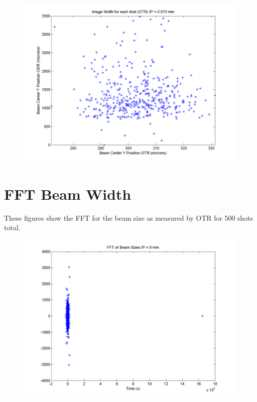 \documentclass[12pt]{article}
\begin{document}
\begin{figure}
\begin{center}
\includegraphics[scale=0.5]{Figures/YPosition_OTRODR_570.PNG}
\caption{}
\end{center}
\end{figure}


\newpage

\section{FFT Beam Width}

These figures show the FFT for the beam size as measured by OTR for 500 shots total.

\begin{figure}
\begin{center}
\includegraphics[scale=0.5]{Figures/FFT_0.PNG}
\caption{}
\end{center}
\end{figure}
\end{document}
